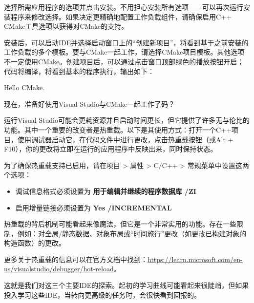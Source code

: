 选择所需应用程序的选项并点击安装。不用担心安装所有选项——可以再次运行安装程序来修改选择。如果决定更精确地配置工作负载组件，请确保启用C++ CMake工具选项以获得对CMake的支持。

安装后，可以启动IDE并选择启动窗口上的“创建新项目”，将看到基于之前安装的工作负载的多个模板。要与CMake一起工作，请选择CMake项目模板。其他选项不一定使用CMake。创建项目后，可以通过点击窗口顶部绿色的播放按钮开启；代码将编译，将看到基本的程序执行，输出如下：

\begin{shell}
Hello CMake.
\end{shell}

现在，准备好使用Visual Studio与CMake一起工作了码？


运行Visual Studio可能会更耗资源并且启动时间更长，但它提供了许多无与伦比的功能。其中一个重要的改变者是热重载。以下是其使用方式：打开一个C++项目，使用调试器启动它，在代码文件中进行更改，点击热重载按钮（或Alt + F10），你的更改将立即在运行的应用程序中反映出来，同时保持状态。

为了确保热重载支持已启用，请在项目 > 属性 > C/C++ > 常规菜单中设置这两个选项：

\begin{itemize}
\item
调试信息格式必须设置为 \textbf{用于编辑并继续的程序数据库 /ZI}

\item
启用增量链接必须设置为 \textbf{Yes /INCREMENTAL}
\end{itemize}

热重载的背后机制可能看起来像魔法，但它是一个非常实用的功能。存在一些限制，例如：对全局/静态数据、对象布局或“时间旅行”更改（如更改已构建对象的构造函数）的更改。

更多关于热重载的信息可以在官方文档中找到：\url{https://learn.microsoft.com/en-us/visualstudio/debugger/hot-reload}。

这就是我们对这三个主要IDE的探索。起初的学习曲线可能看起来很陡峭，但如果投入学习这些IDE，当转向更高级的任务时，会很快看到回报的。















